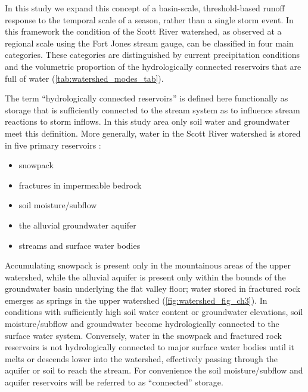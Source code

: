 \documentclass[hess, manuscript]{copernicus}
\providecommand{\tightlist}{%
  \setlength{\itemsep}{0pt}\setlength{\parskip}{0pt}}
\begin{document}
In this study we expand this concept of a basin-scale, threshold-based
runoff response to the temporal scale of a season, rather than a single
storm event. In this framework the condition of the Scott River
watershed, as observed at a regional scale using the Fort Jones stream
gauge, can be classified in four main categories. These categories are
distinguished by current precipitation conditions and the volumetric
proportion of the hydrologically connected reservoirs that are full of
water (\autoref{tab:watershed_modes_tab}).

The term ``hydrologically connected reservoirs'' is defined here
functionally as storage that is sufficiently connected to the stream
system as to influence stream reactions to storm inflows. In this study
area only soil water and groundwater meet this definition. More
generally, water in the Scott River watershed is stored in five primary
reservoirs \citep{Harter2008}:

\begin{itemize}
\tightlist
\item
  snowpack
\item
  fractures in impermeable bedrock
\item
  soil moisture/subflow
\item
  the alluvial groundwater aquifer
\item
  streams and surface water bodies
\end{itemize}

Accumulating snowpack is present only in the mountainous areas of the
upper watershed, while the alluvial aquifer is present only within the
bounds of the groundwater basin underlying the flat valley floor; water
stored in fractured rock emerges as springs in the upper watershed
\citep{Mack1958} (\autoref{fig:watershed_fig_ch3}). In conditions with
sufficiently high soil water content or groundwater elevations, soil
moisture/subflow and groundwater become hydrologically connected to the
surface water system. Conversely, water in the snowpack and fractured
rock reservoirs is not hydrologically connected to major surface water
bodies until it melts or descends lower into the watershed, effectively
passing through the aquifer or soil to reach the stream. For convenience
the soil moisture/subflow and aquifer reservoirs will be referred to as
``connected'' storage.
\end{document}
